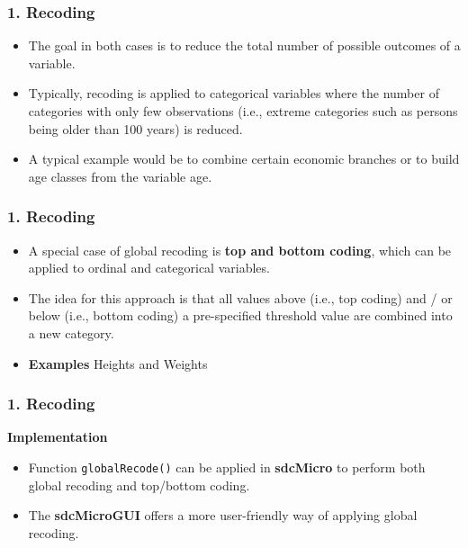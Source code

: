 \documentclass{beamer}
\begin{document}
\begin{frame}
	\frametitle{1. Recoding}
	\begin{itemize}
\item The goal in both cases is to reduce the total number of possible outcomes of a
variable. 
\item Typically, recoding is applied to categorical variables where the number
of categories with only few observations (i.e., extreme categories such as persons
being older than 100 years) is reduced. 
\item A typical example would be to combine
certain economic branches or to build age classes from the variable age.
\end{itemize}
\end{frame}
\begin{frame}
	\frametitle{1. Recoding}
	\begin{itemize}
\item A special case of global recoding is \textbf{top and bottom coding}, which can be applied
to ordinal and categorical variables. 
\item The idea for this approach is that all values
above (i.e., top coding) and / or below (i.e., bottom coding) a pre-specified threshold
value are combined into a new category. 
\item \textbf{Examples} Heights and Weights
\end{itemize}
\end{frame}
\begin{frame}
	\frametitle{1. Recoding}
\textbf{Implementation}
	\begin{itemize}

\item Function \texttt{globalRecode()} can be applied in \textbf{sdcMicro} to perform both global
recoding and top/bottom coding. 
\item The \textbf{sdcMicroGUI} offers a more user-friendly
way of applying global recoding.
\end{itemize}
\end{frame}
\end{document}

